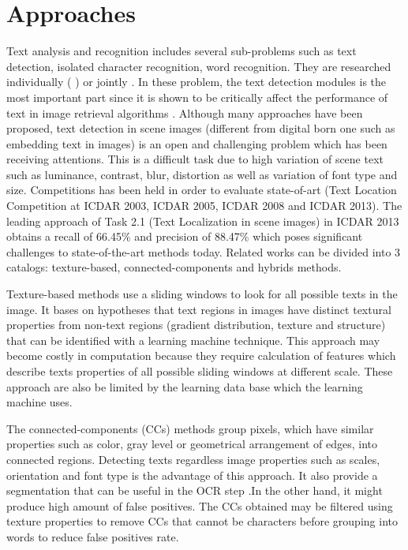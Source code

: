 \section{Approaches}
Text analysis and recognition includes several sub-problems such as text detection, isolated character recognition, word recognition. They are researched individually (\cite{Campos.2010.CVPR} \cite{Chen.2004.CVPR} \cite{Liu.2006.CRA} \cite{Epshtein.2010.CVPR} \cite{xucheng.2013.pami}) or jointly \cite{Neumann12}. In these problem, the text detection modules is the most important part since it is shown to be critically affect the performance of text in image retrieval algorithms \cite{Epshtein.2010.CVPR}. Although many approaches have been proposed, text detection in scene images (different from digital born one such as embedding text in images) is an open and challenging problem which has been receiving attentions. This is a difficult task due to high variation of scene text such as luminance, contrast, blur, distortion as well as variation of font type and size. Competitions has been held in order to evaluate state-of-art (Text Location Competition at ICDAR 2003, ICDAR 2005, ICDAR 2008 and ICDAR 2013). The leading approach of Task 2.1 (Text Localization in scene images) in ICDAR 2013 obtains a recall of 66.45\% and precision of 88.47\% \cite{ICDAR.2013} which poses significant challenges to state-of-the-art methods today. Related works can be divided into 3 catalogs: texture-based, connected-components and hybrids methods. 
\par
Texture-based methods \cite{Chen.2004.CVPR} use a sliding windows to look for all possible texts in the image. It bases on hypotheses that text regions in images have distinct textural properties from non-text regions (gradient distribution, texture and structure) that can be identified with a learning machine technique. This approach may become costly in computation because they require calculation of features which describe texts properties of all possible sliding windows at different scale. These approach are also be limited by the learning data base which the learning machine uses. 
\par
The connected-components (CCs) methods \cite{Epshtein.2010.CVPR} \cite{xucheng.2013.pami} group pixels, which have similar properties such as color, gray level or geometrical arrangement of edges, into connected regions. Detecting texts regardless image properties such as scales, orientation and font type is the advantage of this approach. It also provide a segmentation that can be useful in the OCR step .In the other hand, it might produce high amount of false positives. The CCs obtained may be filtered using texture properties to remove CCs that cannot be characters before grouping into words to reduce false positives rate.
